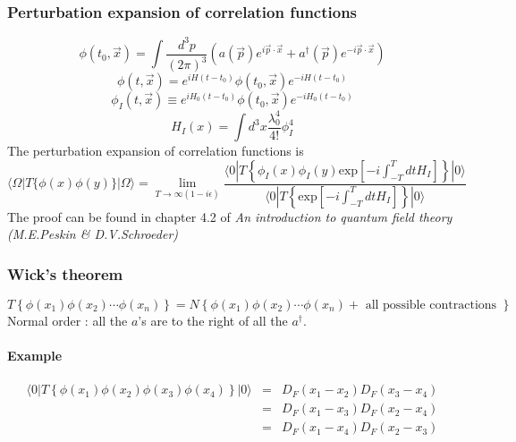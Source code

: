 \documentclass{article}
\begin{document}
\subsubsection{Perturbation expansion of correlation functions}
\[\phi(t_0,\vec{x}) = \int \frac{d^3p}{(2\pi)^3}( a(\vec{p})e^{i\vec{p}\cdot\vec{x}} + a^{\dagger}(\vec{p})e^{-i\vec{p}\cdot\vec{x}})\]
\[\phi(t,\vec{x}) = e^{iH(t-t_0)} \phi(t_0,\vec{x}) e^{-iH(t-t_0)}\]
\[\phi_I(t,\vec{x}) \equiv e^{iH_0(t-t_0)} \phi(t_0,\vec{x}) e^{-iH_0(t-t_0)}\]
\[H_I(x) = \int d^3x \frac{\lambda_0^4}{4!} \phi_I^4\]
The perturbation expansion of correlation functions is
\[\langle \Omega | T \{ \phi(x) \phi(y) \} | \Omega \rangle = \lim_{T \to \infty(1-i\epsilon)} \frac{\langle 0 | T \left\{ \phi_I(x) \phi_I(y) \mathrm{exp} \left[ -i \int_{-T}^{T} dt H_I \right]\right\} | 0 \rangle}{\langle 0 | T \left\{ \mathrm{exp} \left[ -i \int_{-T}^{T} dt H_I \right]\right\} | 0 \rangle}\]
The proof can be found in chapter 4.2 of \emph{An introduction to quantum field theory (M.E.Peskin \& D.V.Schroeder)}

\subsubsection{Wick's theorem}
\[T \left\{ \phi(x_1) \phi(x_2) \cdots \phi(x_n)\right\} = N \left\{ \phi(x_1) \phi(x_2) \cdots \phi(x_n) + \mbox{ all possible contractions }\right\} \]
Normal order : all the $a$'s are to the right of all the $a^{\dagger}$.
\paragraph{Example} 
\begin{eqnarray}
\langle 0 | T \left\{ \phi(x_1) \phi(x_2) \phi(x_3) \phi(x_4)\right\}| 0 \rangle &=& D_F(x_1-x_2)D_F(x_3-x_4) \nonumber \\
&=& D_F(x_1-x_3)D_F(x_2-x_4) \nonumber \\
&=& D_F(x_1-x_4)D_F(x_2-x_3) \nonumber
\end{eqnarray}
\end{document}
